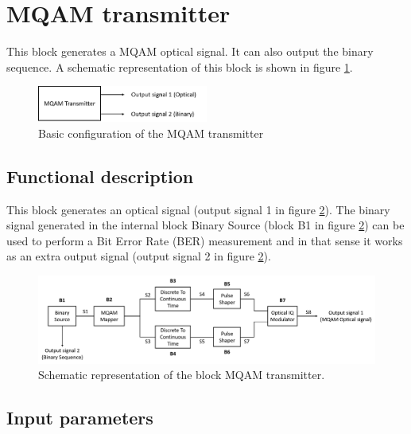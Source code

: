 \clearpage

\section{MQAM transmitter}

This block generates a MQAM optical signal. It can also output the binary sequence. A schematic representation of this block is shown in figure \ref{MQAM_transmitter_block_diagram_simple}.

\begin{figure}[h]
	\centering
	\includegraphics[width=0.5\textwidth]{./lib/m_qam_transmitter/figures/MQAM_transmitter_block_diagram_simple}
	\caption{Basic configuration of the MQAM transmitter}\label{MQAM_transmitter_block_diagram_simple}
\end{figure}

\subsection*{Functional description}

This block generates an optical signal (output signal 1 in figure \ref{MQAM_transmitter_block_diagram}). The binary signal generated in the internal block Binary Source (block B1 in figure \ref{MQAM_transmitter_block_diagram}) can be used to perform a Bit Error Rate (BER) measurement and in that sense it works as an extra output signal (output signal 2 in figure \ref{MQAM_transmitter_block_diagram}).

\begin{figure}[h]
	\centering
	\includegraphics[width=\textwidth]{./lib/m_qam_transmitter/figures/MQAM_transmitter_block_diagram}
	\caption{Schematic representation of the block MQAM transmitter.}\label{MQAM_transmitter_block_diagram}
\end{figure}

\subsection*{Input parameters}

